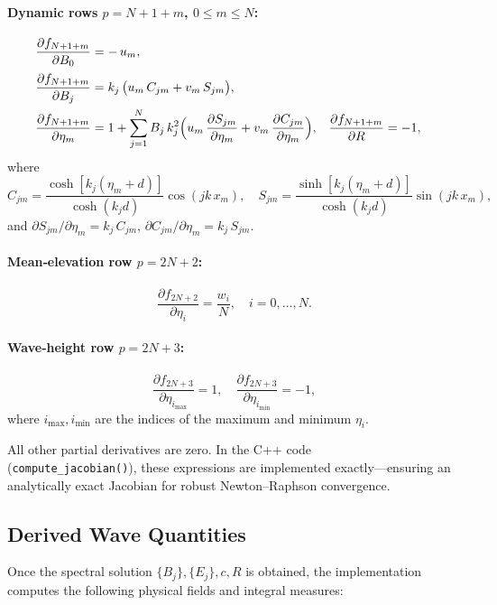 \documentclass[11pt,letterpaper]{article}
\begin{document}
\paragraph{Dynamic rows \(p=N+1+m\), \(0\le m\le N\):}
\begin{align}
\frac{\partial f_{N+1+m}}{\partial B_{0}}
  &= -\,u_{m},
  \\[0.5ex]
\frac{\partial f_{N+1+m}}{\partial B_{j}}
  &= k_{j}\,\bigl(u_{m}\,C_{jm} + v_{m}\,S_{jm}\bigr),
  \\
\frac{\partial f_{N+1+m}}{\partial \eta_{m}}
  &= 1
     + \sum_{j=1}^{N}
       B_{j}\,k_{j}^{2}
       \Bigl(u_{m}\,\frac{\partial S_{jm}}{\partial \eta_{m}}
           + v_{m}\,\frac{\partial C_{jm}}{\partial \eta_{m}}\Bigr),
  &
\frac{\partial f_{N+1+m}}{\partial R}
  &= -1,
\end{align}
where
\[
C_{jm} = \frac{\cosh[k_{j}(\eta_{m}+d)]}{\cosh(k_{j}d)}\cos(jk\,x_{m}), 
\quad
S_{jm} = \frac{\sinh[k_{j}(\eta_{m}+d)]}{\cosh(k_{j}d)}\sin(jk\,x_{m}),
\]
and
\(\partial S_{jm}/\partial \eta_{m} = k_{j} \,C_{jm}\), 
\(\partial C_{jm}/\partial \eta_{m} = k_{j} \,S_{jm}.\)

\paragraph{Mean‐elevation row \(p=2N+2\):}
\[
\frac{\partial f_{2N+2}}{\partial \eta_{i}}
  = \frac{w_i}{N},\quad i=0,\dots,N.
\]

\paragraph{Wave‐height row \(p=2N+3\):}
\[
\frac{\partial f_{2N+3}}{\partial \eta_{i_{\max}}} = 1,
\quad
\frac{\partial f_{2N+3}}{\partial \eta_{i_{\min}}} = -1,
\]
where \(i_{\max},i_{\min}\) are the indices of the maximum and minimum \(\eta_{i}\).

\medskip
All other partial derivatives are zero.  In the C++ code \\
(\texttt{compute\_jacobian()}), these expressions are implemented exactly—ensuring an analytically exact Jacobian for robust Newton–Raphson convergence.

\subsection{Derived Wave Quantities}
\label{sec:derived_quantities}

Once the spectral solution \(\{B_j\},\{E_j\},c,R\) is obtained, the implementation computes the following physical fields and integral measures:
\end{document}

